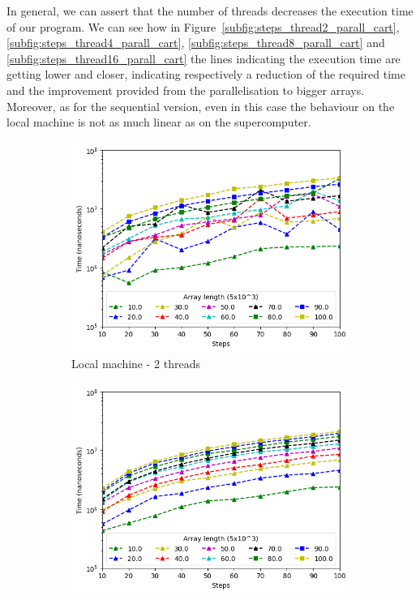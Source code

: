 \documentclass[a4paper]{article}
\begin{document}
In general, we can assert that the number of threads decreases the execution time of our program. We can see how in Figure~\ref{subfig:steps_thread2_parall_cart}, \ref{subfig:steps_thread4_parall_cart}, \ref{subfig:steps_thread8_parall_cart} and \ref{subfig:steps_thread16_parall_cart} the lines indicating the execution time are getting lower and closer, indicating respectively a reduction of the required time and the improvement provided from the parallelisation to bigger arrays. Moreover, as for the sequential version, even in this case the behaviour on the local machine is not as much linear as on the supercomputer.


\begin{figure}[htbp]
\centering
\begin{subfigure}{.42\textwidth}
  \centering
  \includegraphics[width=\linewidth]{res/parallel/array_thread_2_steps_res.png}
  \caption{Local machine - 2 threads}
  \label{subfig:steps_thread2_parall}
\end{subfigure}%
\begin{subfigure}{.42\textwidth}
  \centering
  \includegraphics[width=\linewidth]{res/parallel/array_thread_2_steps_res_cartesius.png}

\end{subfigure}
\end{figure}
\end{document}
